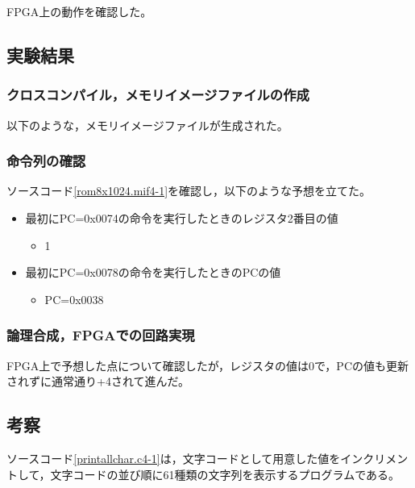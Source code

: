 FPGA上の動作を確認した。

\subsection{実験結果}
\subsubsection{クロスコンパイル，メモリイメージファイルの作成}
以下のような，メモリイメージファイルが生成された。


\subsubsection{命令列の確認}
ソースコード\ref{rom8x1024.mif4-1}を確認し，以下のような予想を立てた。
\begin{itemize}
  \item 最初にPC=0x0074の命令を実行したときのレジスタ2番目の値
  \begin{itemize}
    \item 1
  \end{itemize}
  \item 最初にPC=0x0078の命令を実行したときのPCの値
  \begin{itemize}
    \item PC=0x0038
  \end{itemize}
\end{itemize}

\subsubsection{論理合成，FPGAでの回路実現}
FPGA上で予想した点について確認したが，レジスタの値は0で，PCの値も更新されずに通常通り+4されて進んだ。

\subsection{考察}
ソースコード\ref{printallchar.c4-1}は，文字コードとして用意した値をインクリメントして，文字コードの並び順に61種類の文字列を表示するプログラムである。

